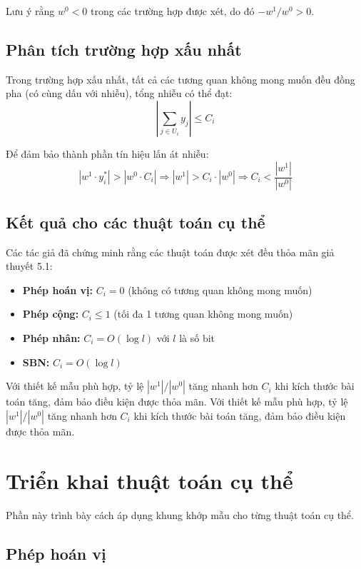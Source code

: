 Lưu ý rằng $w^0 < 0$ trong các trường hợp được xét, do đó $-w^1/w^0 > 0$.

\subsection{Phân tích trường hợp xấu nhất}

Trong trường hợp xấu nhất, tất cả các tương quan không mong muốn đều đồng pha (có cùng dấu với nhiễu), tổng nhiễu có thể đạt:
\begin{equation}
    \left|\sum_{j \in U_i} y_j\right| \leq C_i
\end{equation}

Để đảm bảo thành phần tín hiệu lấn át nhiễu:
\begin{equation}
    |w^1 \cdot y_i^*| > |w^0 \cdot C_i| \Rightarrow |w^1| > C_i \cdot |w^0| \Rightarrow C_i < \frac{|w^1|}{|w^0|}
\end{equation}

\subsection{Kết quả cho các thuật toán cụ thể}

Các tác giả đã chứng minh rằng các thuật toán được xét đều thỏa mãn giả thuyết 5.1:
\begin{itemize}
    \item \textbf{Phép hoán vị:} $C_i = 0$ (không có tương quan không mong muốn)
    \item \textbf{Phép cộng:} $C_i \leq 1$ (tối đa 1 tương quan không mong muốn)
    \item \textbf{Phép nhân:} $C_i = O(\log l)$ với $l$ là số bit
    \item \textbf{SBN:} $C_i = O(\log l)$
\end{itemize}

Với thiết kế mẫu phù hợp, tỷ lệ $|w^1|/|w^0|$ tăng nhanh hơn $C_i$ khi kích thước bài toán tăng, đảm bảo điều kiện được thỏa mãn.
Với thiết kế mẫu phù hợp, tỷ lệ $|w^1|/|w^0|$ tăng nhanh hơn $C_i$ khi kích thước bài toán tăng, đảm bảo điều kiện được thỏa mãn.

\section{Triển khai thuật toán cụ thể}

Phần này trình bày cách áp dụng khung khớp mẫu cho từng thuật toán cụ thể.

\subsection{Phép hoán vị}

